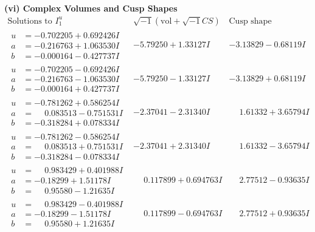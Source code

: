 \documentclass[1p]{elsarticle_modified}
\theoremstyle{definition}
\newcommand{\I}{\sqrt{-1}}
\begin{document}
\newpage\flushleft \textbf{(vi) Complex Volumes and Cusp Shapes}
$$\begin{array}{c|c|c}  
\text{Solutions to }I^u_{1}& \I (\text{vol} + \sqrt{-1}CS) & \text{Cusp shape}\\
 \hline 
\begin{aligned}
u &= -0.702205 + 0.692426 I \\
a &= -0.216763 + 1.063530 I \\
b &= -0.000164 - 0.427737 I\end{aligned}
 & -5.79250 + 1.33127 I & -3.13829 - 0.68119 I \\ \hline\begin{aligned}
u &= -0.702205 - 0.692426 I \\
a &= -0.216763 - 1.063530 I \\
b &= -0.000164 + 0.427737 I\end{aligned}
 & -5.79250 - 1.33127 I & -3.13829 + 0.68119 I \\ \hline\begin{aligned}
u &= -0.781262 + 0.586254 I \\
a &= \phantom{-}0.083513 - 0.751531 I \\
b &= -0.318284 + 0.078334 I\end{aligned}
 & -2.37041 - 2.31340 I & \phantom{-}1.61332 + 3.65794 I \\ \hline\begin{aligned}
u &= -0.781262 - 0.586254 I \\
a &= \phantom{-}0.083513 + 0.751531 I \\
b &= -0.318284 - 0.078334 I\end{aligned}
 & -2.37041 + 2.31340 I & \phantom{-}1.61332 - 3.65794 I \\ \hline\begin{aligned}
u &= \phantom{-}0.983429 + 0.401988 I \\
a &= -0.18299 + 1.51178 I \\
b &= \phantom{-}0.95580 - 1.21635 I\end{aligned}
 & \phantom{-}0.117899 + 0.694763 I & \phantom{-}2.77512 - 0.93635 I \\ \hline\begin{aligned}
u &= \phantom{-}0.983429 - 0.401988 I \\
a &= -0.18299 - 1.51178 I \\
b &= \phantom{-}0.95580 + 1.21635 I\end{aligned}
 & \phantom{-}0.117899 - 0.694763 I & \phantom{-}2.77512 + 0.93635 I \\ \hline\begin{aligned}

\end{aligned}
\end{array}$$
\end{document}
